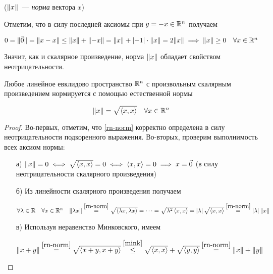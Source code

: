 \documentclass[../../main.tex]{subfiles}
\begin{document}
($\lVert{x}\rVert$~--- \textit{норма} вектора $x$)

\bigskip

Отметим, что в силу последней аксиомы при $y = -x \in \mathbb{R}^n$ получаем

$0 = \lVert{\vec 0}\rVert = \lVert{x - x}\rVert \le \lVert{x}\rVert + \lVert{-x}\rVert =
 \lVert{x}\rVert + \left|{-1}\right| \cdot \lVert{x}\rVert = 2\lVert{x}\rVert \implies \lVert{x}\rVert \ge 0
 \quad \forall x \in \mathbb{R}^n$
 
Значит, как и скалярное произведение, норма $\lVert{x}\rVert$ обладает
свойством неотрицательности.

\begin{thm}
 Любое линейное евклидово пространство $\mathbb{R}^n$ с произвольным скалярным
 произведением нормируется с помощью естественной нормы
 
 \begin{equation}
  \label{rn-norm}
  \lVert{x}\rVert = \sqrt{\left<x, x\right>} \quad \forall x \in \mathbb{R}^n
 \end{equation}
 
\end{thm}

\begin{proof}
 Во-первых, отметим, что \eqref{rn-norm} корректно определена в силу 
 неотрицательности подкоренного выражения. Во-вторых, проверим
 выполнимость всех аксиом нормы:
 
 \begin{enumerate}
  \item[а)]
  $\lVert{x}\rVert = 0 \iff \sqrt{\left<x, x\right>} = 0 \iff
  \left<x, x\right> = 0 \implies x = \vec 0$ (в силу 
  неотрицательности скалярного произведения)
  
  \item[б)]
  Из линейности скалярного произведения получаем
  
  $\forall \lambda \in \mathbb{R} \quad \forall x \in \mathbb{R}^n \quad
   \lVert{\lambda x}\rVert \stackrel{\eqref{rn-norm}}{=}
   \sqrt{\left<\lambda x, \lambda x\right>} = \dots =
   \sqrt{\lambda^2\left<x, x\right>} =
   \left|{\lambda}\right| \sqrt{\left<x, x\right>} \stackrel{\eqref{rn-norm}}{=}
   \left|{\lambda}\right| \lVert{x}\rVert$
 
  \item[в)]
  Используя неравенство Минковского, имеем
  
  $\lVert{x+y}\rVert \stackrel{\eqref{rn-norm}}{=}
   \sqrt{\left<x+y, x+y\right>} \stackrel{\eqref{mink}}{\le}
   \sqrt{\left<x, x\right>} + \sqrt{\left<y, y\right>}
   \stackrel{\eqref{rn-norm}}{=} \lVert{x}\rVert + \lVert{y}\rVert$
 \end{enumerate}
 
\end{proof}
\end{document}
